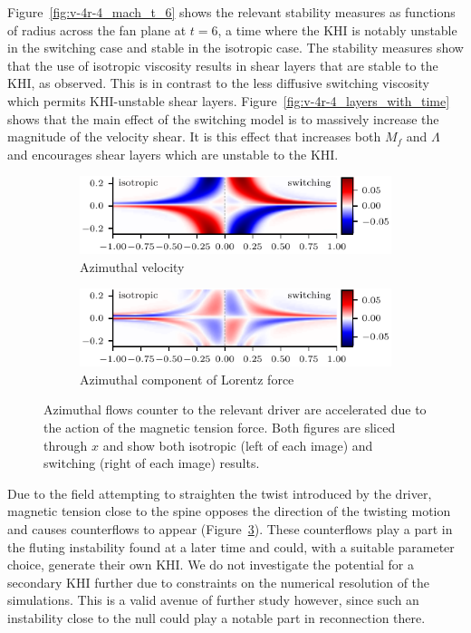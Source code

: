 Figure~\ref{fig:v-4r-4_mach_t_6} shows the relevant stability measures as functions of radius across the fan plane at $t=6$, a time where the KHI is notably unstable in the switching case and stable in the isotropic case. The stability measures show that the use of isotropic viscosity results in shear layers that are stable to the KHI, as observed. This is in contrast to the less diffusive switching viscosity which permits KHI-unstable shear layers. Figure~\ref{fig:v-4r-4_layers_with_time} shows that the main effect of the switching model is to massively increase the magnitude of the velocity shear. It is this effect that increases both $M_f$ and $\Lambda$ and encourages shear layers which are unstable to the KHI.

\begin{figure}[t]
  \centering
    \begin{subfigure}{0.49\textwidth}
      \includegraphics[width=\linewidth]{v-4r-4_counterflows_t_3}
      \caption{Azimuthal velocity}
      \label{fig:v-4r-4_counterflows_t_3}
    \end{subfigure}
    \hfill
    \begin{subfigure}{0.49\textwidth}
      \includegraphics[width=\linewidth]{v-4r-4_lorentz_counterflows_t_3}
      \caption{Azimuthal component of Lorentz force}
      \label{fig:v-4r-4_lorentz_counterflows_t_3}
    \end{subfigure}
\caption{Azimuthal flows counter to the relevant driver are accelerated due to the action of the magnetic tension force. Both figures are sliced through $x$ and show both isotropic (left of each image) and switching (right of each image) results.}
\label{fig:counterflows}%
\end{figure}

Due to the field attempting to straighten the twist introduced by the driver, magnetic tension close to the spine opposes the direction of the twisting motion and causes counterflows to appear (Figure~\ref{fig:counterflows}). These counterflows play a part in the fluting instability found at a later time and could, with a suitable parameter choice, generate their own KHI. We do not investigate the potential for a secondary KHI further due to constraints on the numerical resolution of the simulations. This is a valid avenue of further study however, since such an instability close to the null could play a notable part in reconnection there.

